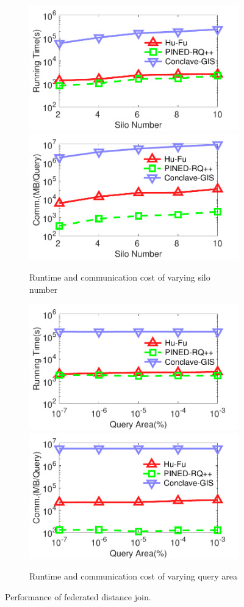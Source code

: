 \begin{figure}[t]
    \centering
    \begin{subfigure}{0.48\textwidth}
        \centering
        \includegraphics[width=0.48\linewidth]{traffic_join_silo_time.pdf}
        \includegraphics[width=0.48\linewidth]{traffic_join_silo_comm.pdf}
        \caption{Runtime and communication cost of varying silo number}
        \label{fig:symmetric-join-eff-silo-n}
    \end{subfigure}
    \begin{subfigure}{0.48\textwidth}
        \centering
        \includegraphics[width=0.48\linewidth]{traffic_join_area_time.pdf}
        \includegraphics[width=0.48\linewidth]{traffic_join_area_comm.pdf}
        \caption{Runtime and communication cost of varying query area}
        \label{fig:symmetric-join-eff-r-n}
    \end{subfigure}
    \caption{Performance of federated distance join.}
    \label{fig:symmetric-join-eff}
\end{figure}


